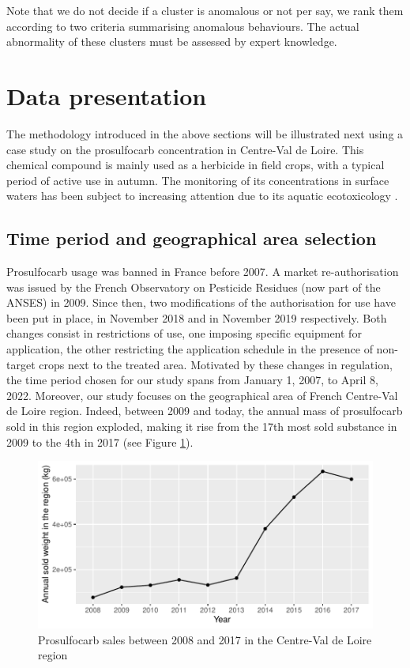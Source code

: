 Note that we do not decide if a cluster is anomalous or not per say, we rank them according to two criteria summarising anomalous behaviours. The actual abnormality of these clusters must be assessed by expert knowledge.


\section{Data presentation}\label{section:data}

The methodology introduced in the above sections will be illustrated next using a case study on the prosulfocarb  concentration \cite{Prosulfocarb:NIH:url} in Centre-Val de Loire. This chemical compound is mainly used as a herbicide in field crops, with a typical period of active use in autumn. The monitoring of its concentrations in surface waters has been subject to increasing attention due to its aquatic ecotoxicology \cite{PPV,Prosulfocarb:PPDB}.

\subsection{Time period and geographical area selection}
\label{section:data-naiade}

Prosulfocarb usage was banned in France before 2007. A market re-authorisation was issued by the French Observatory on Pesticide Residues (now part of the ANSES) in 2009.
Since then, two modifications of the authorisation for use have been put in place, in November 2018 and in November 2019 respectively. Both changes consist in restrictions of use, one imposing specific equipment for application, the other restricting the application schedule in the presence of non-target crops next to the treated area. Motivated by these changes in regulation, the time period chosen for our study spans from January 1, 2007, to April 8, 2022.
Moreover, our study focuses on the geographical area of French Centre-Val de Loire region. Indeed, between 2009 and today, the annual mass of prosulfocarb sold in this region  exploded, making it rise from the 17th most sold substance in 2009 to the 4th in 2017 (see Figure \ref{fig:sale}). 

\begin{figure}[htbp]
  \centering
  \includegraphics[]{figs/App/Sales_pro.pdf}
  \caption{Prosulfocarb sales between 2008 and 2017 in the Centre-Val de Loire region}
  \label{fig:sale}
\end{figure}


